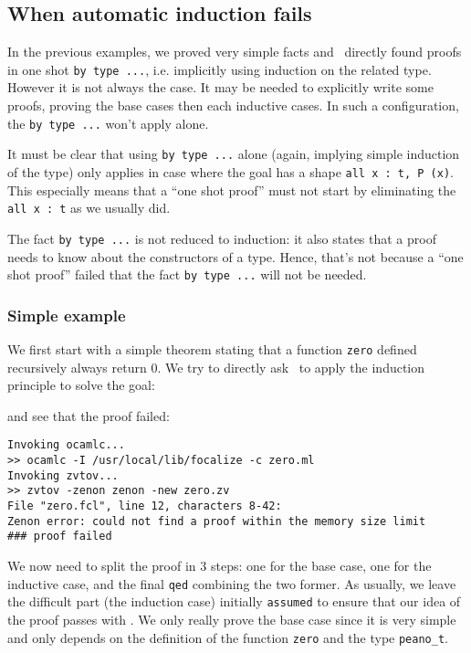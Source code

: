 \documentclass[11pt,a4paper,twoside,onecolumn,fullpage]{article}
\begin{document}
{\scriptsize
}


\subsection{When automatic induction fails}
In the previous examples, we proved very simple facts and \zenon\ directly found
proofs in one shot \lstinline"by type ...", i.e. implicitly using
induction on the related type. However it is not always the case. It
may be needed to explicitly write some proofs, proving the base cases
then each inductive cases. In such a configuration, the
\lstinline"by type ..." won't apply alone.

It must be clear that using \lstinline"by type ..." alone (again,
implying simple induction of the type) only applies in case where the
goal has a shape \lstinline"all x : t, P (x)". This especially means
that a ``one shot proof'' must not start by eliminating the
\lstinline"all x : t" as we usually did.

The fact \lstinline"by type ..." is not reduced to induction: it also
states that a proof needs to know about the constructors of a
type. Hence, that's not because a ``one shot proof'' failed that the
fact \lstinline"by type ..." will not be needed.

\subsubsection{Simple example}
We first start with a simple theorem stating that a function \lstinline"zero"
defined recursively always return 0. We try to directly ask \zenon\ to apply
the induction principle to solve the goal:

{\scriptsize
}

\noindent and see that the proof failed:
{\scriptsize
\begin{verbatim}
Invoking ocamlc...
>> ocamlc -I /usr/local/lib/focalize -c zero.ml
Invoking zvtov...
>> zvtov -zenon zenon -new zero.zv
File "zero.fcl", line 12, characters 8-42:
Zenon error: could not find a proof within the memory size limit
### proof failed
\end{verbatim}}

We now need to split the proof in 3 steps: one for the base case, one
for the inductive case, and the final \lstinline"qed" combining the
two former. As usually, we leave the difficult part (the induction
case) initially \lstinline"assumed" to ensure that our idea of the
proof passes with \zenon.  We only really prove the base case since it
is very simple and only depends on the definition of the function
\lstinline"zero" and the type \lstinline"peano_t".
\end{document}
